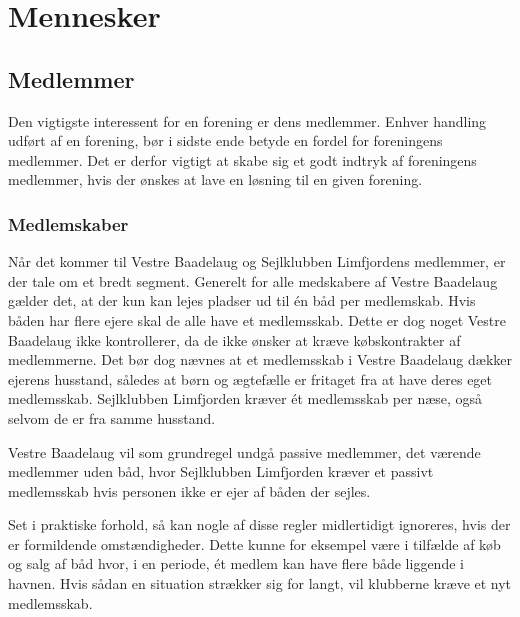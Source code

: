







\section{Mennesker}
\subsection{Medlemmer}

Den vigtigste interessent for en forening er dens medlemmer. Enhver handling udført af en forening, bør i sidste ende betyde en fordel for foreningens medlemmer. Det er derfor vigtigt at skabe sig et godt indtryk af foreningens medlemmer, hvis der ønskes at lave en løsning til en given forening.


\subsubsection{Medlemskaber}

Når det kommer til Vestre Baadelaug og Sejlklubben Limfjordens medlemmer, er der tale om et bredt segment. Generelt for alle medskabere af Vestre Baadelaug gælder det, at der kun kan lejes pladser ud til én båd per medlemskab. Hvis båden har flere ejere skal de alle have et medlemsskab. Dette er dog noget Vestre Baadelaug ikke kontrollerer, da de ikke ønsker at kræve købskontrakter af medlemmerne. Det bør dog nævnes at et medlemsskab i Vestre Baadelaug dækker ejerens husstand, således at børn og ægtefælle er fritaget fra at have deres eget medlemsskab. Sejlklubben Limfjorden kræver ét medlemsskab per næse, også selvom de er fra samme husstand.

Vestre Baadelaug vil som grundregel undgå passive medlemmer, det værende medlemmer uden båd, hvor Sejlklubben Limfjorden kræver et passivt medlemsskab hvis personen ikke er ejer af båden der sejles.

Set i praktiske forhold, så kan nogle af disse regler midlertidigt ignoreres, hvis der er formildende omstændigheder. Dette kunne for eksempel være i tilfælde af køb og salg af båd hvor, i en periode, ét medlem kan have flere både liggende i havnen. Hvis sådan en situation strækker sig for langt, vil klubberne kræve et nyt medlemsskab.

